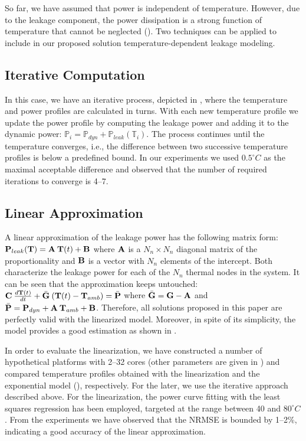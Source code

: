 So far, we have assumed that power is independent of temperature. However, due to the leakage component, the power dissipation is a strong function of temperature that cannot be neglected (). Two techniques can be applied to include in our proposed solution temperature-dependent leakage modeling.

\subsection{Iterative Computation} \label{sec:iterative-leakage}
In this case, we have an iterative process, depicted in , where the temperature and power profiles are calculated in turns. With each new temperature profile we update the power profile by computing the leakage power and adding it to the dynamic power: $\mathbb{P}_i = \mathbb{P}_{dyn} + \mathbb{P}_{leak}(\mathbb{T}_i)$. The process continues until the temperature converges, i.e., the difference between two successive temperature profiles is below a predefined bound. In our experiments we used $0.5^\circ C$ as the maximal acceptable difference and observed that the number of required iterations to converge is 4--7.

\subsection{Linear Approximation} \label{sec:linearized-leakage}
A linear approximation of the leakage power has the following matrix form: $\mathbf{P}_{leak}(\mathbf{T}) = \mathbf{A} \: \mathbf{T}(t) + \mathbf{B}$ where $\mathbf{A}$ is a $N_n \times N_n$ diagonal matrix of the proportionality and $\mathbf{B}$ is a vector with $N_n$ elements of the intercept. Both characterize the leakage power for each of the $N_n$ thermal nodes in the system. It can be seen that the approximation keeps  untouched: $\mathbf{C} \: \frac{d\mathbf{T}(t)}{dt} + \bar{\mathbf{G}} \: (\mathbf{T}(t) - \mathbf{T}_{amb}) = \bar{\mathbf{P}}$ where $\bar{\mathbf{G}} = \mathbf{G} - \mathbf{A}$ and $\bar{\mathbf{P}} = \mathbf{P}_{dyn} + \mathbf{A} \: \mathbf{T}_{amb} + \mathbf{B}$. Therefore, all solutions proposed in this paper are perfectly valid with the linearized model. Moreover, in spite of its simplicity, the model provides a good estimation as shown in \cite{liu2007}.

In order to evaluate the linearization, we have constructed a number of hypothetical platforms with 2--32 cores (other parameters are given in ) and compared temperature profiles obtained with the linearization and the exponential model (), respectively. For the later, we use the iterative approach described above. For the linearization, the power curve fitting with the least squares regression \cite{press2007} has been employed, targeted at the range between 40 and $80^\circ C$. From the experiments we have observed that the NRMSE is bounded by 1--2\%, indicating a good accuracy of the linear approximation.
